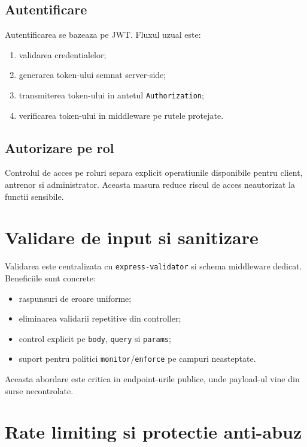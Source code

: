 \subsection{Autentificare}

Autentificarea se bazeaza pe JWT. Fluxul uzual este:
\begin{enumerate}[leftmargin=1.2cm]
    \item validarea credentialelor;
    \item generarea token-ului semnat server-side;
    \item transmiterea token-ului in antetul \texttt{Authorization};
    \item verificarea token-ului in middleware pe rutele protejate.
\end{enumerate}

\subsection{Autorizare pe rol}

Controlul de acces pe roluri separa explicit operatiunile disponibile pentru client, antrenor si administrator. Aceasta masura reduce riscul de acces neautorizat la functii sensibile.

\section{Validare de input si sanitizare}

Validarea este centralizata cu \texttt{express-validator} si schema middleware dedicat. Beneficiile sunt concrete:
\begin{itemize}[leftmargin=1.2cm]
    \item raspunsuri de eroare uniforme;
    \item eliminarea validarii repetitive din controller;
    \item control explicit pe \texttt{body}, \texttt{query} si \texttt{params};
    \item suport pentru politici \texttt{monitor}/\texttt{enforce} pe campuri neasteptate.
\end{itemize}

Aceasta abordare este critica in endpoint-urile publice, unde payload-ul vine din surse necontrolate.

\section{Rate limiting si protectie anti-abuz}

